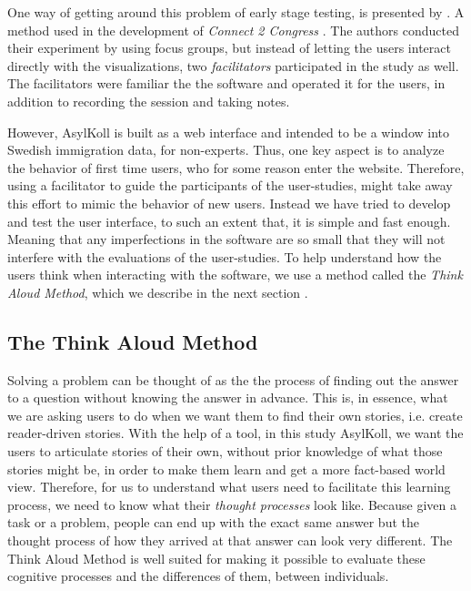 \documentclass{acmtog} %
\begin{document}
One way of getting around this problem of early stage testing, is presented by \citet{kinnaird2010focus}. A method used in the development of \emph{Connect 2 Congress} \cite{kinnaird2010connect}. The authors conducted their experiment by using focus groups, but instead of letting the users interact directly with the visualizations, two \emph{facilitators} participated in the study as well. The facilitators were familiar the the software and operated it for the users, in addition to recording the session and taking notes.

However, AsylKoll is built as a web interface and intended to be a window into Swedish immigration data, for non-experts. Thus, one key aspect is to analyze the behavior of first time users, who for some reason enter the website. Therefore, using a facilitator to guide the participants of the user-studies, might take away this effort to mimic the behavior of new users. Instead we have tried to develop and test the user interface, to such an extent that, it is simple and fast enough. Meaning that any imperfections in the software are so small that they will not interfere with the evaluations of the user-studies. To help understand how the users think when interacting with the software, we use a method called the \emph{Think Aloud Method}, which we describe in the next section \cite{someren1994think}.

\subsection{The Think Aloud Method}
\label{sub:think_aloud}
Solving a problem can be thought of as the the process of finding out the answer to a question without knowing the answer in advance. This is, in essence, what we are asking users to do when we want them to find their own stories, i.e. create reader-driven stories. With the help of a tool, in this study AsylKoll, we want the users to articulate stories of their own, without prior knowledge of what those stories might be, in order to make them learn and get a more fact-based world view. Therefore, for us to understand what users need to facilitate this learning process, we need to know what their \emph{thought processes} look like. Because given a task or a problem, people can end up with the exact same answer but the thought process of how they arrived at that answer can look very different. The Think Aloud Method is well suited for making it possible to evaluate these cognitive processes and the differences of them, between individuals.
\end{document}
